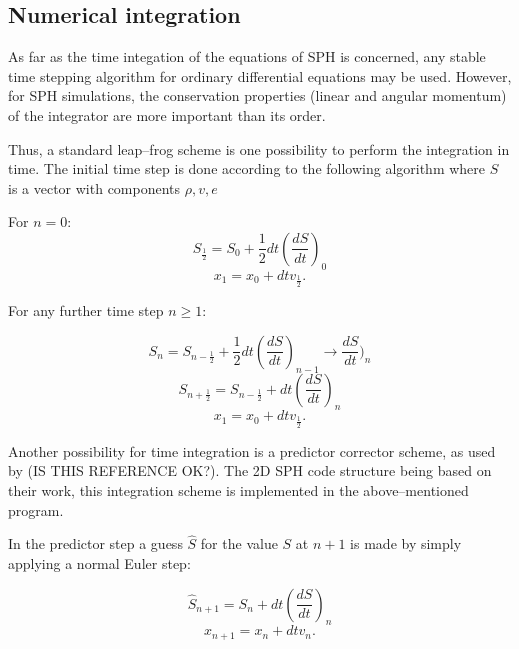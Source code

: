 \documentclass{report}
\begin{document}
\subsection{Numerical integration}
\label{sec:numIntegr}

As far as the time integation of the equations of SPH is concerned, any stable
time stepping algorithm for ordinary differential equations may be
used\cite{Monaghan2005}. However, for SPH simulations, the conservation properties
(linear and angular momentum) of the integrator are more important than its
order\cite{Monaghan2005}.

Thus, a standard leap--frog scheme is one possibility to perform the integration in
time. The initial time step is done according to the following algorithm where
$S$ is a vector with components  $\rho,v,e$

For $n=0$:
\begin{equation}
S_{\frac{1}{2}}=S_0+\frac{1}{2}dt\left(\frac{dS}{dt}\right)_0
\end{equation}
\begin{equation}
x_1=x_0+dt v_{\frac{1}{2}}.
\end{equation}

For any further time step $n\ge1$:

\begin{equation}
S_n=S_{n-\frac{1}{2}}+\frac{1}{2}dt\left(\frac{dS}{dt}\right)_{n-1} \rightarrow
\frac{dS}{dt})_n 
\end{equation}
\begin{equation}
S_{n+\frac{1}{2}}=S_{n-\frac{1}{2}}+dt\left(\frac{dS}{dt}\right)_n 
\end{equation}
\begin{equation}
x_1=x_0+dt v_{\frac{1}{2}}.
\end{equation}

Another possibility for time integration is a predictor corrector scheme, as
used by \cite{Hu2007}(IS THIS REFERENCE OK?). The 2D SPH code structure being based on their work,
this integration scheme is implemented in the above--mentioned program.

In the predictor step a guess $\hat S$ for the value $S$ at $n+1$ is made by simply
applying a normal Euler step:

\begin{equation}
\hat S_{n+1}=S_n+dt\left(\frac{dS}{dt}\right)_n
\end{equation}
\begin{equation}
x_{n+1}=x_n+dt v_{n}.
\end{equation}
\end{document}
